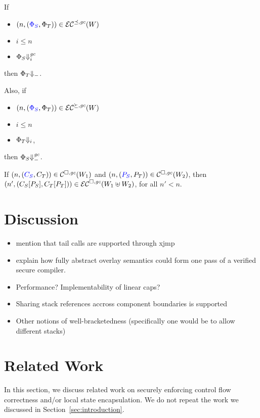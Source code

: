\documentclass[acmsmall,review,anonymous]{acmart}\settopmatter{printfolios=true,printccs=false,printacmref=false}
\begin{document}
\begin{lemma}
  \label{lem:adequacy}
  If
  \begin{itemize}
  \item $\npair{\stpair{\Phi}{\Phi}}\in\lrec[\preceq,\gc](W)$
  \item $i \leq n$
  \item $\Phi_S \sterm[i]{\gc}$
  \end{itemize}
  then $\Phi_T\term$.

  Also, if
  \begin{itemize}
  \item $\npair{\stpair{\Phi}{\Phi}}\in\lrec[\succeq,\gc](W)$
  \item $i \leq n$
  \item $\Phi_T \term[i]$,
  \end{itemize}
  then $\Phi_S\sterm{\gc}$.
\end{lemma}

\begin{lemma}
  \label{lem:compat-context-plug}
  If $\npair{\stpair{C}{C}}\in\lrcomp(W_1)$ and $\npair{\stpair{P}{P}} \in \lrcomp(W_2)$, then
  $\npair[n']{(\plug{C_S}{P_S},\plug{C_T}{P_T})} \in \lrec(W_1 \uplus W_2)$, for all $n' < n$.
\end{lemma}


\section{Discussion}
\label{sec:discussion}
\begin{itemize}
\item mention that tail calls are supported through xjmp
\item explain how fully abstract overlay semantics could form one pass of a verified secure compiler.
\item Performance?  Implementability of linear caps?
\item Sharing stack references accross component boundaries is supported
\item Other notions of well-bracketedness (specifically one would be to allow different stacks)
\end{itemize}

\section{Related Work}

In this section, we discuss related work on securely enforcing control flow correctness and/or local state encapsulation.
We do not repeat the work we discussed in Section~\ref{sec:introduction}.
\end{document}
